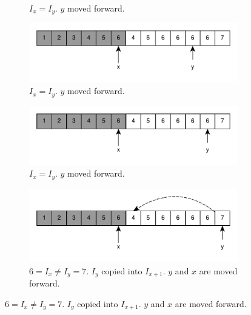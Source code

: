 \begin{figure}
\begin{subfigure}[t]{0.49\textwidth}
		\vspace*{-8mm}
		\caption{$I_x = I_y$. $y$ moved forward.}
		\label{fig:remove_duplicated_sorted_array_inplace:example1_6}
	 \end{subfigure}
	 \hfill
	 \begin{subfigure}[t]{0.49\textwidth}
		\includegraphics[width=1\linewidth]{sources/remove_duplicated_sorted_array_inplace/images/example1_12}
		\caption{$I_x = I_y$. $y$ moved forward.}
		\label{fig:remove_duplicated_sorted_array_inplace:example1_6}
	 \end{subfigure}
	 \hfill
	 \begin{subfigure}[t]{0.49\textwidth}
		\includegraphics[width=1\linewidth]{sources/remove_duplicated_sorted_array_inplace/images/example1_13}
		\vspace*{-8mm}
		\caption{$I_x = I_y$. $y$ moved forward.}
		\label{fig:remove_duplicated_sorted_array_inplace:example1_6}
	 \end{subfigure}
	 \hfill
	 \begin{subfigure}[t]{0.49\textwidth}
		\includegraphics[width=1\linewidth]{sources/remove_duplicated_sorted_array_inplace/images/example1_14}
		\vspace*{-8mm}
		\caption{$6 = I_x \neq I_y = 7$. $I_y$ copied into $I_{x+1}$. $y$ and $x$ are moved forward.}

\end{subfigure}
\end{figure}
